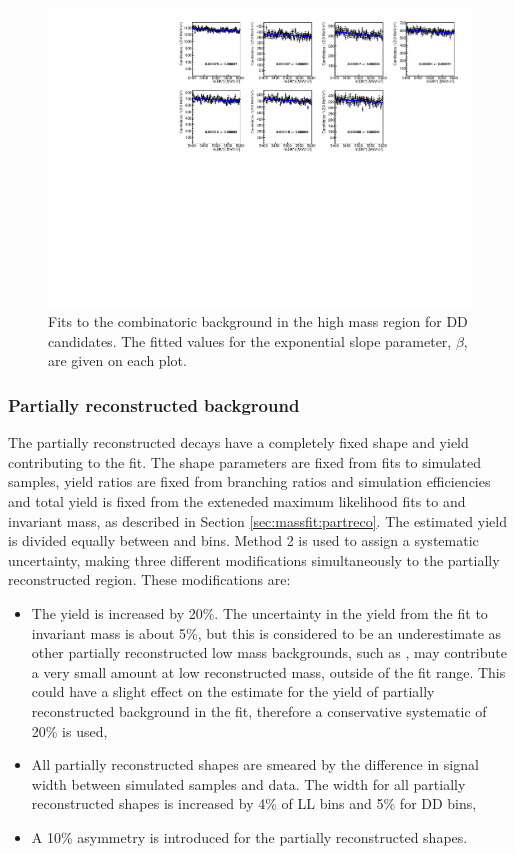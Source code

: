 \begin{figure}[h]
\centering
\includegraphics[width=\linewidth]{figures/fitComponents/combinatoricFits_DD.pdf}
\caption{Fits to the combinatoric background in the high \Bm mass region for DD candidates. The fitted values for the exponential slope parameter, $\beta$, are given on each plot.}
\label{combinatoricDD}
\end{figure}


\subsubsection{Partially reconstructed background}
\label{sec:systematics:partreco}

The partially reconstructed decays have a completely fixed shape and yield contributing to the \CP fit. The shape parameters are fixed from fits to simulated samples, yield ratios are fixed from branching ratios and simulation efficiencies and total yield is fixed from the exteneded maximum likelihood fits to \kpi and \kpipipi invariant mass, as described in Section \ref{sec:massfit:partreco}. The estimated yield is divided equally between \Bp and \Bm bins. Method 2 is used to assign a systematic uncertainty, making three different modifications simultaneously to the partially reconstructed region. These modifications are:

\begin{itemize}
\item The yield is increased by 20\%. The uncertainty in the yield from the fit to \kpi invariant mass is about 5\%, but this is considered to be an underestimate as other partially reconstructed low mass backgrounds, such as \decay{\Bm}{\D\Kstarm\piz}, may contribute a very small amount at low reconstructed \Bm mass, outside of the \CP fit range. This could have a slight effect on the estimate for the yield of partially reconstructed background in the \CP fit, therefore a conservative systematic of 20\% is used,
\item All partially reconstructed shapes are smeared by the difference in signal width between simulated samples and data. The width for all partially reconstructed shapes is increased by 4\% of LL bins and 5\% for DD bins,
\item A 10\% asymmetry is introduced for the partially reconstructed shapes.
\end{itemize}

